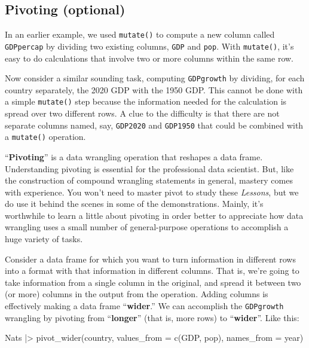 \documentclass[
  letterpaper,
  DIV=11,
  numbers=noendperiod,
  oneside]{scrartcl}
\newenvironment{Shaded}{\begin{snugshade}}{\end{snugshade}}
\newcommand{\AttributeTok}[1]{\textcolor[rgb]{0.40,0.45,0.13}{#1}}
\newcommand{\FunctionTok}[1]{\textcolor[rgb]{0.28,0.35,0.67}{#1}}
\newcommand{\NormalTok}[1]{\textcolor[rgb]{0.00,0.23,0.31}{#1}}
\newcommand{\SpecialCharTok}[1]{\textcolor[rgb]{0.37,0.37,0.37}{#1}}
\begin{document}
\subsection{Pivoting (optional)}\label{pivoting-optional}

In an earlier example, we used \texttt{mutate()} to compute a new column
called \texttt{GDPpercap} by dividing two existing columns, \texttt{GDP}
and \texttt{pop}. With \texttt{mutate()}, it's easy to do calculations
that involve two or more columns within the same row.

Now consider a similar sounding task, computing \texttt{GDPgrowth} by
dividing, for each country separately, the 2020 GDP with the 1950 GDP.
This cannot be done with a simple \texttt{mutate()} step because the
information needed for the calculation is spread over two different
rows. A clue to the difficulty is that there are not separate columns
named, say, \texttt{GDP2020} and \texttt{GDP1950} that could be combined
with a \texttt{mutate()} operation.

``\textbf{Pivoting}'' is a data wrangling operation that reshapes a data
frame. Understanding pivoting is essential for the professional data
scientist. But, like the construction of compound wrangling statements
in general, mastery comes with experience. You won't need to master
pivot to study these \emph{Lessons}, but we do use it behind the scenes
in some of the demonstrations. Mainly, it's worthwhile to learn a little
about pivoting in order better to appreciate how data wrangling uses a
small number of general-purpose operations to accomplish a huge variety
of tasks.

Consider a data frame for which you want to turn information in
different rows into a format with that information in different columns.
That is, we're going to take information from a single column in the
original, and spread it between two (or more) columns in the output from
the operation. Adding columns is effectively making a data frame
``\textbf{wider}.'' We can accomplish the \texttt{GDPgrowth} wrangling
by pivoting from ``\textbf{longer}'' (that is, more rows) to
``\textbf{wider}''. Like this:

\begin{Shaded}
\begin{Highlighting}[]
\NormalTok{Nats }\SpecialCharTok{|\textgreater{}} \FunctionTok{pivot\_wider}\NormalTok{(country, }\AttributeTok{values\_from =} \FunctionTok{c}\NormalTok{(GDP, pop), }\AttributeTok{names\_from =}\NormalTok{ year)}
\end{Highlighting}
\end{Shaded}
\end{document}
